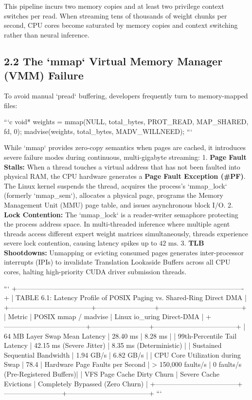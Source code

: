 \documentclass[11pt,twoside,openright]{amsbook}
\begin{document}
{{{{{{{This pipeline incurs two memory copies and at least two privilege context switches per read. When streaming tens of thousands of weight chunks per second, CPU cores become saturated by memory copies and context switching rather than neural inference.

\subsection{2.2 The `mmap` Virtual Memory Manager (VMM) Failure}

To avoid manual `pread` buffering, developers frequently turn to memory-mapped files:

```c
void* weights = mmap(NULL, total_bytes, PROT_READ, MAP_SHARED, fd, 0);
madvise(weights, total_bytes, MADV_WILLNEED);
```

While `mmap` provides zero-copy semantics when pages are cached, it introduces severe failure modes during continuous, multi-gigabyte streaming:
1. \textbf{Page Fault Stalls:} When a thread touches a virtual address that has not been faulted into physical RAM, the CPU hardware generates a \textbf{Page Fault Exception (#PF)}. The Linux kernel suspends the thread, acquires the process's `mmap_lock` (formerly `mmap_sem`), allocates a physical page, programs the Memory Management Unit (MMU) page table, and issues asynchronous block I/O.
2. \textbf{Lock Contention:} The `mmap_lock` is a reader-writer semaphore protecting the process address space. In multi-threaded inference where multiple agent threads access different expert weight matrices simultaneously, threads experience severe lock contention, causing latency spikes up to $42\text{ ms}$.
3. \textbf{TLB Shootdowns:} Unmapping or evicting consumed pages generates inter-processor interrupts (IPIs) to invalidate Translation Lookaside Buffers across all CPU cores, halting high-priority CUDA driver submission threads.

```
+----------------------------------------------------------------------------------------------------+
| TABLE 6.1: Latency Profile of POSIX Paging vs. Shared-Ring Direct DMA                            |
+------------------------------------+--------------------------+------------------------------------+
| Metric                             | POSIX mmap / madvise     | Linux io_uring Direct-DMA     |
+------------------------------------+--------------------------+------------------------------------+
| 64 MB Layer Swap Mean Latency      | 28.40 ms                 | 8.28 ms                            |
| 99th-Percentile Tail Latency       | 42.15 ms (Severe Jitter) | 8.35 ms (Deterministic)            |
| Sustained Sequential Bandwidth     | 1.94 GB/s                | 6.82 GB/s                          |
| CPU Core Utilization during Swap   | 78.4%
| Hardware Page Faults per Second    | > 150,000 faults/s       | 0 faults/s (Pre-Registered Buffers)|
| VFS Page Cache Dirty Churn         | Severe Cache Evictions   | Completely Bypassed (Zero Churn)   |
+------------------------------------+--------------------------+------------------------------------+
```

}}}}}}}
\end{document}
